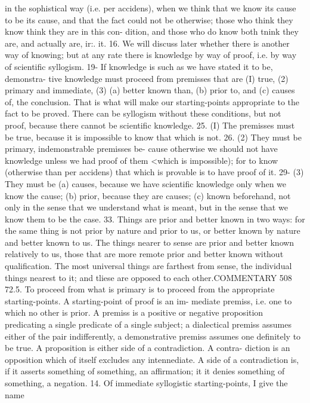 {{in the sophistical way (i.e. per accidens), when we think that we
know its cause to be its cause, and that the fact could not be
otherwise; those who think they know think they are in this con-
dition, and those who do know both tnink they are, and actually
are, ir:. it.
16. We will discuss later whether there is another way of
knowing; but at any rate there is knowledge by way of proof, i.e.
by way of scientific syllogism.
19- If knowledge is such as we have stated it to be, demonstra-
tive knowledge must proceed from premisses that are (I) true,
(2) primary and immediate, (3) (a) better known than, (b) prior
to, and (c) causes of, the conclusion. That is what will make
our starting-points appropriate to the fact to be proved. There
can be syllogism without these conditions, but not proof, because
there cannot be scientific knowledge.
25. (I) The premisses must be true, because it is impossible
to know that which is not.
26. (2) They must be primary, indemonstrable premisses be-
cause otherwise we should not have knowledge unless we had
proof of them <which is impossible); for to know (otherwise than
per accidens) that which is provable is to have proof of it.
29- (3) They must be (a) causes, because we have scientific
knowledge only when we know the cause; (b) prior, because they
are causes; (c) known beforehand, not only in the sense that we
understand what is meant, but in the sense that we know them
to be the case.
33. Things are prior and better known in two ways: for the
same thing is not prior by nature and prior to us, or better known
by nature and better known to us. The things nearer to sense are
prior and better known relatively to us, those that are more
remote prior and better known without qualification. The most
universal things are farthest from sense, the individual things
nearest to it; and tliese are opposed to each other.COMMENTARY
508
72.5. To proceed from what is primary is to proceed from the
appropriate starting-points. A starting-point of proof is an im-
mediate premiss, i.e. one to which no other is prior. A premiss is
a positive or negative proposition predicating a single predicate
of a single subject; a dialectical premiss assumes either of the pair
indifferently, a demonstrative premiss assumes one definitely to be
true. A proposition is either side of a contradiction. A contra-
diction is an opposition which of itself excludes any intennediate.
A side of a contradiction is, if it asserts something of something,
an affirmation; it it denies something of something, a negation.
14. Of immediate syllogistic starting-points, I give the name
}}
